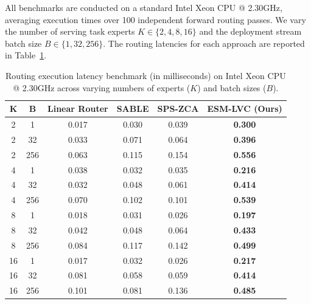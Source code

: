 All benchmarks are conducted on a standard Intel Xeon CPU @ 2.30GHz, averaging execution times over 100 independent forward routing passes. We vary the number of serving task experts $K \in \{2, 4, 8, 16\}$ and the deployment stream batch size $B \in \{1, 32, 256\}$. The routing latencies for each approach are reported in Table~\ref{tab:latency_results}.

\begin{table}[t]
\caption{Routing execution latency benchmark (in milliseconds) on Intel Xeon CPU @ 2.30GHz across varying numbers of experts ($K$) and batch sizes ($B$).}
\label{tab:latency_results}
\vskip 0.15in
\begin{center}
\begin{small}
\begin{sc}
\begin{tabular}{cccccc}
\toprule
K & B & Linear Router & SABLE & SPS-ZCA & \textbf{ESM-LVC (Ours)} \\
\midrule
2 & 1 & 0.017 & 0.030 & 0.039 & \textbf{0.300} \\
2 & 32 & 0.033 & 0.071 & 0.064 & \textbf{0.396} \\
2 & 256 & 0.063 & 0.115 & 0.154 & \textbf{0.556} \\
\hline
4 & 1 & 0.038 & 0.032 & 0.035 & \textbf{0.216} \\
4 & 32 & 0.032 & 0.048 & 0.061 & \textbf{0.414} \\
4 & 256 & 0.070 & 0.102 & 0.101 & \textbf{0.539} \\
\hline
8 & 1 & 0.018 & 0.031 & 0.026 & \textbf{0.197} \\
8 & 32 & 0.042 & 0.048 & 0.064 & \textbf{0.433} \\
8 & 256 & 0.084 & 0.117 & 0.142 & \textbf{0.499} \\
\hline
16 & 1 & 0.017 & 0.032 & 0.026 & \textbf{0.217} \\
16 & 32 & 0.081 & 0.058 & 0.059 & \textbf{0.414} \\
16 & 256 & 0.101 & 0.081 & 0.136 & \textbf{0.485} \\
\bottomrule
\end{tabular}
\end{sc}
\end{small}
\end{center}
\vskip -0.1in
\end{table}

